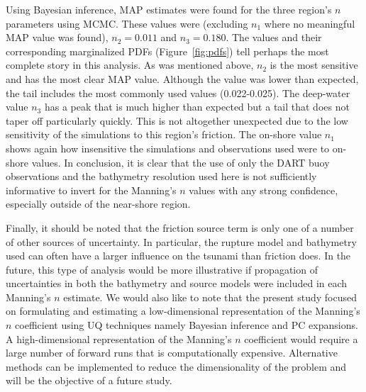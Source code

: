 Using Bayesian inference, MAP estimates were found for the three region's $n$
parameters using MCMC.  These values were (excluding $n_1$ where no meaningful
MAP value was found), $n_2=0.011$ and $n_3=0.180$.  The values and their
corresponding marginalized PDFs (Figure~\ref{fig:pdfs}) tell perhaps the most
complete story in this analysis.  As was mentioned above, $n_2$ is the most
sensitive and has the most clear MAP value.  Although the value was lower than
expected, the tail includes the most commonly used values (0.022-0.025).  The
deep-water value $n_3$ has a peak that is much higher than expected but a tail
that does not taper off particularly quickly.  This is not altogether unexpected
due to the low sensitivity of the simulations to this region's friction.  The
on-shore value $n_1$ shows again how insensitive the simulations and
observations used were to on-shore values.  In conclusion, it is clear that the 
use of only the DART buoy observations and the bathymetry resolution used here 
is not sufficiently informative to invert for the Manning's $n$ values with any
strong confidence, especially outside of the near-shore region.

Finally, it should be noted that the friction source term is only one of a
number of other sources of uncertainty.  In particular, the rupture model and
bathymetry used can often have a larger influence on the tsunami than friction
does.  In the future, this type of analysis would be more illustrative if
propagation of uncertainties in both the bathymetry and source models were
included in each Manning's $n$ estimate.  We would also like to note that the
present study focused on formulating and estimating a low-dimensional
representation of the Manning's $n$ coefficient using UQ techniques namely
Bayesian inference and PC expansions.  A high-dimensional representation of the
Manning's $n$ coefficient would require a large number of forward runs that is
computationally expensive.  Alternative methods can be implemented to reduce the
dimensionality of the problem and will be the objective of a future study.

